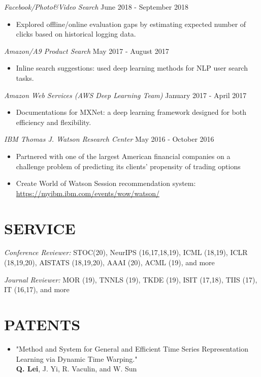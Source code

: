 \documentclass[margin, 10pt]{res} %
\begin{document}
\begin{resume}
{\sl Facebook/Photo\&Video Search} \hfill June 2018 - September 2018
\begin{itemize}
  \item Explored offline/online evaluation gaps by estimating expected number of 
    clicks based on historical logging data.
\end{itemize}
{\sl Amazon/A9 Product Search} \hfill May 2017 - August 2017
\begin{itemize}
  \item Inline search suggestions: used deep learning methods for NLP user 
    search tasks.
\end{itemize}
{\sl Amazon Web Services (AWS Deep Learning Team)} \hfill January 2017 - April 2017
\begin{itemize}
  \item Documentations for MXNet: a deep learning framework designed for 
    both efficiency and flexibility.
  \end{itemize}
{\sl IBM Thomas J. Watson Research Center} \hfill May 2016 - October 2016
\begin{itemize}
\item  %
  Partnered with one of the largest American financial companies on a challenge problem of predicting its clients' propensity of trading options
\item Create World of Watson Session recommendation system:\\
  \url{https://myibm.ibm.com/events/wow/watson/}
\end{itemize} 


\section{SERVICE}
{\sl Conference Reviewer:} STOC(20), NeurIPS (16,17,18,19), ICML (18,19), ICLR (18,19,20), 
AISTATS (18,19,20), AAAI (20), ACML (19), and more

{\sl Journal Reviewer:} MOR (19), TNNLS (19), TKDE (19), ISIT (17,18), TIIS (17), 
IT (16,17), and more

\section{PATENTS}\begin{itemize}
 \item{"Method and System for General and Efficient Time Series Representation 
     Learning via Dynamic Time Warping."\\
   \textbf{Q. Lei}, J. Yi, R. Vaculin, and W. Sun}


\end{itemize}
\end{resume}
\end{document}
